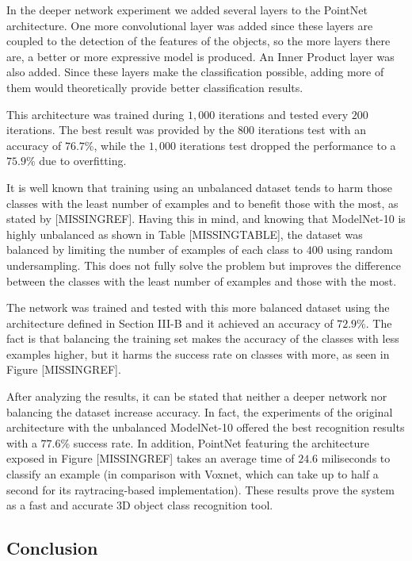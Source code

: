 In the deeper network experiment we added several layers to the PointNet architecture. One more convolutional layer was added since these layers are coupled to the detection of the features of the objects, so the more layers there are, a better or more expressive model is produced. An Inner Product layer was also added. Since these layers make the classification possible, adding more of them would theoretically provide better classification results.

This architecture was trained during $1,000$ iterations and tested every $200$ iterations. The best result was provided by the $800$ iterations test with an accuracy of $76.7$\%, while the $1,000$ iterations test dropped the performance to a $75.9$\% due to overfitting.

It is well known that training using an unbalanced dataset tends to harm those classes with the least number of examples and to benefit those with the most, as stated by [MISSINGREF]. Having this in mind, and knowing that ModelNet-10 is highly unbalanced as shown in Table [MISSINGTABLE], the dataset was balanced by limiting the number of examples of each class to $400$ using random undersampling. This does not fully solve the problem but improves the difference between the classes with the least number of examples and those with the most.

The network was trained and tested with this more balanced dataset using the architecture defined in Section III-B and it achieved an accuracy of $72.9$\%. The fact is that balancing the training set makes the accuracy of the classes with less examples higher, but it harms the success rate on classes with more, as seen in Figure [MISSINGREF].

After analyzing the results, it can be stated that neither a deeper network nor balancing the dataset increase accuracy. In fact, the experiments of the original architecture with the unbalanced ModelNet-10 offered the best recognition results with a $77.6$\% success rate. In addition, PointNet featuring the architecture exposed in Figure [MISSINGREF] takes an average time of $24.6$ miliseconds to classify an example (in comparison with Voxnet, which can take up to half a second for its raytracing-based implementation). These results prove the system as a fast and accurate 3D object class recognition tool.

\subsection{Conclusion}
\label{cha:objrecog:sec:pointnet:subsec:conclusion}

